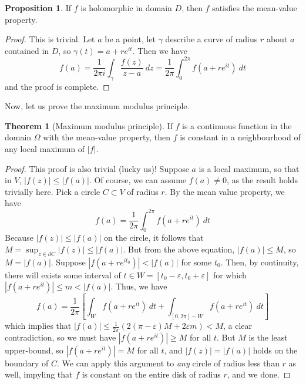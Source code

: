\documentclass[aps,pra,showpacs,notitlepage,onecolumn,superscriptaddress,nofootinbib]{revtex4-1}
\theoremstyle{definition}
\newtheorem{theorem}{Theorem}[section]
\newtheorem{prop}{Proposition}[section]
\begin{document}
\begin{prop}
  If $f$ is holomorphic in domain $D$, then $f$ satisfies the mean-value property.
\end{prop}
\begin{proof}
  This is trivial. Let $a$ be a point, let $\gamma$ describe a curve of radius $r$ about $a$ contained in $D$, so $\gamma(t) = a + r e^{it}$. Then we have
  \begin{equation}
    f(a) = \frac{1}{2\pi i} \displaystyle\int_{\gamma} \frac{f(z)}{z - a} \ dz = \frac{1}{2\pi} \displaystyle\int_{0}^{2\pi} f(a + re^{it}) \ dt
  \end{equation}
  and the proof is complete.
\end{proof}

\noindent Now, let us prove the maximum modulus principle.

\begin{theorem}[Maximum modulus principle]
If $f$ is a continuous function in the domain $\Omega$ with the mean-value property, then $f$ is constant in a neighbourhood of any local maximum of $|f|$.
\end{theorem}
\begin{proof}
  This proof is also trivial (lucky us)! Suppose $a$ is a local maximum, so that in $V$, $|f(z)| \leq |f(a)|$. Of course, we can assume $f(a) \neq 0$, as the result holds trivially here. Pick a circle $C \subset V$ of radius $r$.
  By the mean value property, we have
  \begin{equation}
    f(a) = \frac{1}{2\pi} \displaystyle\int_{0}^{2\pi} f(a + re^{it}) \ dt
  \end{equation}
  Because $|f(z)| \leq |f(a)|$ on the circle, it follows that $M = \sup_{z \in \partial C} |f(z)| \leq |f(a)|$. But from the above equation, $|f(a)| \leq M$, so
  $M = |f(a)|$. Suppose $|f(a + re^{it_0})| < |f(a)|$ for some $t_0$. Then, by continuity, there will exists some interval of $t \in W = [t_0 - \varepsilon, t_0 + \varepsilon]$
  for which $|f(a + r e^{it})| \leq m < |f(a)|$. Thus, we have
  \begin{equation}
    f(a) = \frac{1}{2\pi} \left[ \displaystyle\int_{W} f(a + r e^{it}) \ dt + \displaystyle\int_{[0, 2\pi] - W} f(a + r e^{it}) \ dt \right]
  \end{equation}
  which implies that $|f(a)| \leq \frac{1}{2\pi} (2(\pi - \varepsilon) M + 2 \varepsilon m) < M$, a clear contradiction, so we must have $|f(a + re^{it})| \geq M$ for all $t$.
  But $M$ is the least upper-bound, so $|f(a + re^{it})| = M$ for all $t$, and $|f(z)| = |f(a)|$ holds on the boundary of $C$. We can apply this argument to \emph{any} circle
  of radius less than $r$ as well, impyling that $f$ is constant on the entire disk of radius $r$, and we done.
\end{proof}
\end{document}
